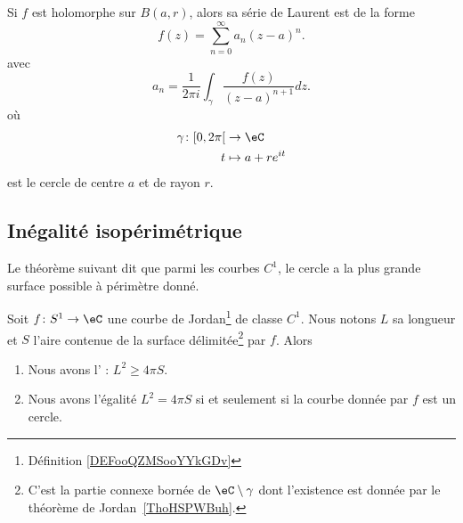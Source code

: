 \begin{proposition}     \label{PROPooBMZGooLoaGLK}
	Si \( f\) est holomorphe sur \( B(a,r)\), alors sa série de Laurent est de la forme
	\begin{equation}
		f(z)=\sum_{n=0}^{\infty}a_n(z-a)^n.
	\end{equation}
	avec
	\begin{equation}
		a_n=\frac{1}{ 2\pi i }\int_{\gamma}\frac{ f(z) }{ (z-a)^{n+1} }dz.
	\end{equation}
	où
	\begin{equation}
		\begin{aligned}
			\gamma\colon \mathopen[ 0 , 2\pi \mathclose[ & \to \eC            \\
			t                                            & \mapsto a+ re^{it}
		\end{aligned}
	\end{equation}
	est le cercle de centre \( a\) et de rayon \( r\).
\end{proposition}

\subsection{Inégalité isopérimétrique}

Le théorème suivant dit que parmi les courbes \( C^1\), le cercle a la plus grande surface possible à périmètre donné.
\begin{theorem}    \label{ThoIXyctPo}
	Soit \( f\colon S^1\to \eC \) une courbe de Jordan\footnote{Définition \ref{DEFooQZMSooYYkGDv}} de classe \( C^1\). Nous notons \( L\) sa longueur et \( S\) l'aire contenue de la surface délimitée\footnote{C'est la partie connexe bornée de \( \eC\setminus\gamma\) dont l'existence est donnée par le théorème de Jordan~\ref{ThoHSPWBuh}.} par \( f\). Alors
	\begin{enumerate}
		\item
		      Nous avons l' : \( L^2\geq 4\pi S\).
		\item
		      Nous avons l'égalité \( L^2=4\pi S\) si et seulement si la courbe donnée par \( f\) est un cercle.
	\end{enumerate}
\end{theorem}

